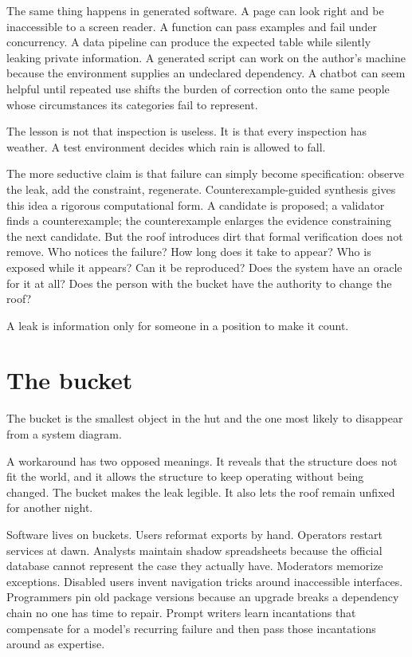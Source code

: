 \documentclass[11pt]{article}
\begin{document}
The same thing happens in generated software. A page can look right and be inaccessible to a screen reader. A function can pass examples and fail under concurrency. A data pipeline can produce the expected table while silently leaking private information. A generated script can work on the author's machine because the environment supplies an undeclared dependency. A chatbot can seem helpful until repeated use shifts the burden of correction onto the same people whose circumstances its categories fail to represent.

The lesson is not that inspection is useless. It is that every inspection has weather. A test environment decides which rain is allowed to fall.

The more seductive claim is that failure can simply become specification: observe the leak, add the constraint, regenerate. Counterexample-guided synthesis gives this idea a rigorous computational form. A candidate is proposed; a validator finds a counterexample; the counterexample enlarges the evidence constraining the next candidate. But the roof introduces dirt that formal verification does not remove. Who notices the failure? How long does it take to appear? Who is exposed while it appears? Can it be reproduced? Does the system have an oracle for it at all? Does the person with the bucket have the authority to change the roof?

A leak is information only for someone in a position to make it count.

\section*{The bucket}

The bucket is the smallest object in the hut and the one most likely to disappear from a system diagram.

A workaround has two opposed meanings. It reveals that the structure does not fit the world, and it allows the structure to keep operating without being changed. The bucket makes the leak legible. It also lets the roof remain unfixed for another night.

Software lives on buckets. Users reformat exports by hand. Operators restart services at dawn. Analysts maintain shadow spreadsheets because the official database cannot represent the case they actually have. Moderators memorize exceptions. Disabled users invent navigation tricks around inaccessible interfaces. Programmers pin old package versions because an upgrade breaks a dependency chain no one has time to repair. Prompt writers learn incantations that compensate for a model's recurring failure and then pass those incantations around as expertise.
\end{document}
